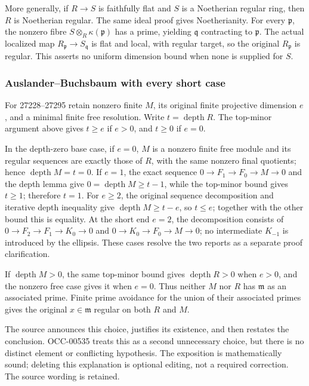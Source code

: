 More generally, if \(R\to S\) is faithfully flat and \(S\) is a Noetherian regular ring, then \(R\) is Noetherian regular. The same ideal proof gives Noetherianity. For every \(\mathfrak p\), the nonzero fibre \(S\otimes_R\kappa(\mathfrak p)\) has a prime, yielding \(\mathfrak q\) contracting to \(\mathfrak p\). The actual localized map \(R_{\mathfrak p}\to S_{\mathfrak q}\) is flat and local, with regular target, so the original \(R_{\mathfrak p}\) is regular. This asserts no uniform dimension bound when none is supplied for \(S\).

\subsubsection{Auslander--Buchsbaum with every short case}\label{algebra-proof-023-auslanderbuchsbaum-with-every-short-case}

For 27228--27295 retain nonzero finite \(M\), its original finite projective dimension \(e\), and a minimal finite free resolution. Write \(t=\operatorname{depth}R\). The top-minor argument above gives \(t\ge e\) if \(e>0\), and \(t\ge0\) if \(e=0\).

In the depth-zero base case, if \(e=0\), \(M\) is a nonzero finite free module and its regular sequences are exactly those of \(R\), with the same nonzero final quotients; hence \(\operatorname{depth}M=t=0\). If \(e=1\), the exact sequence \(0\to F_1\to F_0\to M\to0\) and the depth lemma give \(0=\operatorname{depth}M\ge t-1\), while the top-minor bound gives \(t\ge1\); therefore \(t=1\). For \(e\ge2\), the original sequence decomposition and iterative depth inequality give \(\operatorname{depth}M\ge t-e\), so \(t\le e\); together with the other bound this is equality. At the short end \(e=2\), the decomposition consists of \(0\to F_2\to F_1\to K_0\to0\) and \(0\to K_0\to F_0\to M\to0\); no intermediate \(K_{-1}\) is introduced by the ellipsis. These cases resolve the two reports as a separate proof clarification.

If \(\operatorname{depth}M>0\), the same top-minor bound gives \(\operatorname{depth}R>0\) when \(e>0\), and the nonzero free case gives it when \(e=0\). Thus neither \(M\) nor \(R\) has \(\mathfrak m\) as an associated prime. Finite prime avoidance for the union of their associated primes gives the original \(x\in\mathfrak m\) regular on both \(R\) and \(M\).

The source announces this choice, justifies its existence, and then restates the conclusion. OCC-00535 treats this as a second unnecessary choice, but there is no distinct element or conflicting hypothesis. The exposition is mathematically sound; deleting this explanation is optional editing, not a required correction. The source wording is retained.

